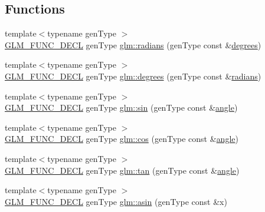 \subsection*{Functions}
\begin{DoxyCompactItemize}
\item 
{\footnotesize template$<$typename gen\+Type $>$ }\\\hyperlink{setup_8hpp_ab2d052de21a70539923e9bcbf6e83a51}{G\+L\+M\+\_\+\+F\+U\+N\+C\+\_\+\+D\+E\+CL} gen\+Type \hyperlink{group__core__func__trigonometric_ga431d31cdb060059bc5b0696e212f1453}{glm\+::radians} (gen\+Type const \&\hyperlink{group__core__func__trigonometric_gaf4e5661bd1c993f6090d49e988a4c78a}{degrees})
\item 
{\footnotesize template$<$typename gen\+Type $>$ }\\\hyperlink{setup_8hpp_ab2d052de21a70539923e9bcbf6e83a51}{G\+L\+M\+\_\+\+F\+U\+N\+C\+\_\+\+D\+E\+CL} gen\+Type \hyperlink{group__core__func__trigonometric_gaf4e5661bd1c993f6090d49e988a4c78a}{glm\+::degrees} (gen\+Type const \&\hyperlink{group__core__func__trigonometric_ga431d31cdb060059bc5b0696e212f1453}{radians})
\item 
{\footnotesize template$<$typename gen\+Type $>$ }\\\hyperlink{setup_8hpp_ab2d052de21a70539923e9bcbf6e83a51}{G\+L\+M\+\_\+\+F\+U\+N\+C\+\_\+\+D\+E\+CL} gen\+Type \hyperlink{group__core__func__trigonometric_gafbab21016b7f3bc21afb09a7e42e2df1}{glm\+::sin} (gen\+Type const \&\hyperlink{group__gtc__quaternion_ga23a3fc7ada5bbb665ff84c92c6e0542c}{angle})
\item 
{\footnotesize template$<$typename gen\+Type $>$ }\\\hyperlink{setup_8hpp_ab2d052de21a70539923e9bcbf6e83a51}{G\+L\+M\+\_\+\+F\+U\+N\+C\+\_\+\+D\+E\+CL} gen\+Type \hyperlink{group__core__func__trigonometric_gac6708d4f0895dc79b65f50db00840167}{glm\+::cos} (gen\+Type const \&\hyperlink{group__gtc__quaternion_ga23a3fc7ada5bbb665ff84c92c6e0542c}{angle})
\item 
{\footnotesize template$<$typename gen\+Type $>$ }\\\hyperlink{setup_8hpp_ab2d052de21a70539923e9bcbf6e83a51}{G\+L\+M\+\_\+\+F\+U\+N\+C\+\_\+\+D\+E\+CL} gen\+Type \hyperlink{group__core__func__trigonometric_ga328aeb0de4f312dc3d200cb929715d44}{glm\+::tan} (gen\+Type const \&\hyperlink{group__gtc__quaternion_ga23a3fc7ada5bbb665ff84c92c6e0542c}{angle})
\item 
{\footnotesize template$<$typename gen\+Type $>$ }\\\hyperlink{setup_8hpp_ab2d052de21a70539923e9bcbf6e83a51}{G\+L\+M\+\_\+\+F\+U\+N\+C\+\_\+\+D\+E\+CL} gen\+Type \hyperlink{group__core__func__trigonometric_gafca5e8c71ea06be0840227b4aafc5680}{glm\+::asin} (gen\+Type const \&x)

\end{DoxyCompactItemize}
